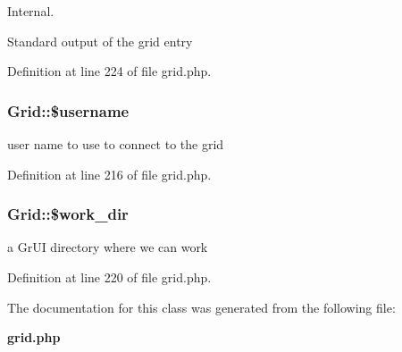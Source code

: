 Internal. 

Standard output of the grid entry 

Definition at line 224 of file grid.php.
\subsubsection{\setlength{\rightskip}{0pt plus 5cm}Grid::\$username}\label{classGrid_o1}


user name to use to connect to the grid 



Definition at line 216 of file grid.php.
\subsubsection{\setlength{\rightskip}{0pt plus 5cm}Grid::\$work\_\-dir}\label{classGrid_o5}


a Gr\-UI directory where we can work 



Definition at line 220 of file grid.php.

The documentation for this class was generated from the following file:\begin{CompactItemize}
\item 
{\bf grid.php}\end{CompactItemize}
